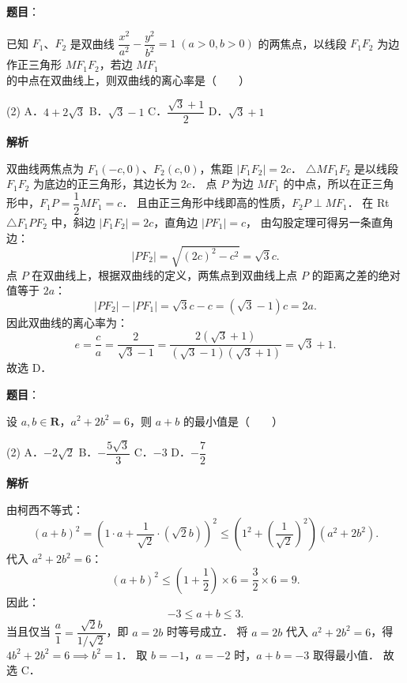 \begin{answer}

\textbf{题目}：

已知 $F_1$、$F_2$ 是双曲线 $\dfrac{x^2}{a^2} - \dfrac{y^2}{b^2} = 1 \; (a > 0, b > 0)$ 的两焦点，以线段 $F_1F_2$ 为边作正三角形 $MF_1F_2$，若边 $MF_1$ 的中点在双曲线上，则双曲线的离心率是\mbox{（　　）}

\begin{gkopts}(2)
\task A．$4 + 2\sqrt{3}$
\task B．$\sqrt{3} - 1$
\task C．$\dfrac{\sqrt{3} + 1}{2}$
\task D．$\sqrt{3} + 1$
\end{gkopts}

\textbf{解析}

双曲线两焦点为 $F_1(-c, 0)$、$F_2(c, 0)$，焦距 $|F_1F_2| = 2c$．
$\triangle MF_1F_2$ 是以线段 $F_1F_2$ 为底边的正三角形，其边长为 $2c$．
点 $P$ 为边 $MF_1$ 的中点，所以在正三角形中，$F_1P = \dfrac{1}{2}MF_1 = c$．
且由正三角形中线即高的性质，$F_2P \perp MF_1$．
在 Rt$\triangle F_1PF_2$ 中，斜边 $|F_1F_2| = 2c$，直角边 $|PF_1| = c$，
由勾股定理可得另一条直角边：
\nopagebreak[4]
\[
|PF_2| = \sqrt{(2c)^2 - c^2} = \sqrt{3}c.
\]
点 $P$ 在双曲线上，根据双曲线的定义，两焦点到双曲线上点 $P$ 的距离之差的绝对值等于 $2a$：
\nopagebreak[4]
\[
|PF_2| - |PF_1| = \sqrt{3}c - c = (\sqrt{3} - 1)c = 2a.
\]
因此双曲线的离心率为：
\nopagebreak[4]
\[
e = \frac{c}{a} = \frac{2}{\sqrt{3} - 1} = \frac{2(\sqrt{3} + 1)}{(\sqrt{3} - 1)(\sqrt{3} + 1)} = \sqrt{3} + 1.
\]
故选 D．


\end{answer}
\begin{answer}

\textbf{题目}：

设 $a, b \in \mathbf{R}$，$a^2 + 2b^2 = 6$，则 $a + b$ 的最小值是\mbox{（　　）}

\begin{gkopts}(2)
\task A．$-2\sqrt{2}$
\task B．$-\dfrac{5\sqrt{3}}{3}$
\task C．$-3$
\task D．$-\dfrac{7}{2}$
\end{gkopts}

\textbf{解析}

由柯西不等式：
\nopagebreak[4]
\[
(a + b)^2 = \left(1 \cdot a + \frac{1}{\sqrt{2}} \cdot (\sqrt{2}b)\right)^2 \leqslant \left(1^2 + \left(\frac{1}{\sqrt{2}}\right)^2\right) (a^2 + 2b^2).
\]
代入 $a^2 + 2b^2 = 6$：
\nopagebreak[4]
\[
(a + b)^2 \leqslant \left(1 + \frac{1}{2}\right) \times 6 = \frac{3}{2} \times 6 = 9.
\]
因此：
\nopagebreak[4]
\[
-3 \leqslant a + b \leqslant 3.
\]
当且仅当 $\dfrac{a}{1} = \dfrac{\sqrt{2}b}{1/\sqrt{2}}$，即 $a = 2b$ 时等号成立．
将 $a = 2b$ 代入 $a^2 + 2b^2 = 6$，得 $4b^2 + 2b^2 = 6 \implies b^2 = 1$．
取 $b = -1$，$a = -2$ 时，$a + b = -3$ 取得最小值．
故选 C．


\end{answer}
